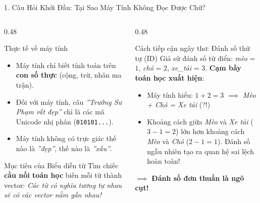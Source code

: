 \documentclass[aspectratio=169, 10pt]{beamer}
\begin{document}
\begin{frame}{1. Câu Hỏi Khởi Đầu: Tại Sao Máy Tính Không Đọc Được Chữ?}
  \begin{columns}[T, onlytextwidth]
    \begin{column}{0.48\textwidth}
      \begin{block}{Thực tế về máy tính}
        \fontsize{7.5}{9.5}\selectfont
        \begin{itemize}\setlength{\itemsep}{0.15em}
          \item Máy tính chỉ biết tính toán trên \textbf{con số thực} (cộng, trừ, nhân ma trận).
          \item Đối với máy tính, câu \textit{''Trường Sư Phạm rất đẹp''} chỉ là các mã Unicode nhị phân (\texttt{010101...}).
          \item Máy tính không có trực giác thế nào là \textit{''đẹp''}, thế nào là \textit{''xấu''}.
        \end{itemize}
      \end{block}
      \vspace{0.15cm}
      \begin{exampleblock}{Mục tiêu của Biểu diễn từ}
        \fontsize{7.5}{9.5}\selectfont
        Tìm chiếc \textbf{cầu nối toán học} biến mỗi từ thành vector: \textit{Các từ có nghĩa tương tự nhau sẽ có các vector nằm gần nhau!}
      \end{exampleblock}
    \end{column}
    \hfill
    \begin{column}{0.48\textwidth}
      \begin{alertblock}{Cách tiếp cận ngây thơ: Đánh số thứ tự (ID)}
        \fontsize{7.5}{9.5}\selectfont
        Giả sử đánh số từ điển:
        \textit{mèo} = $1$, \textit{chó} = $2$, \textit{xe\_tải} = $3$.
        \vspace{0.1cm}
        \textbf{Cạm bẫy toán học xuất hiện}:
        \begin{itemize}\setlength{\itemsep}{0.15em}
          \item Máy tính hiểu: $1 + 2 = 3$ $\implies$ \textit{Mèo + Chó = Xe tải} (?!)
          \item Khoảng cách giữa \textit{Mèo} và \textit{Xe tải} ($3 - 1 = 2$) lớn hơn khoảng cách \textit{Mèo} và \textit{Chó} ($2 - 1 = 1$). Đánh số ngẫu nhiên tạo ra quan hệ sai lệch hoàn toàn!
        \end{itemize}
        $\implies$ \textbf{Đánh số đơn thuần là ngõ cụt!}
      \end{alertblock}
    \end{column}
  \end{columns}
\end{frame}
\end{document}
